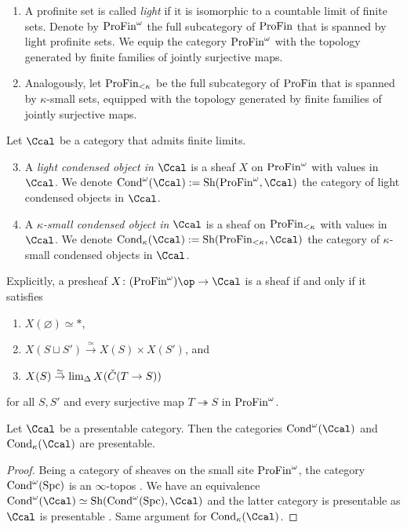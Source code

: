 \documentclass[colorinlistoftodos,article,11pt,reqno]{article}
\newcommand{\Cond}{\textup{Cond}}
\newcommand{\Spc}{\textup{Spc}}
\newcommand{\Sh}{\textup{Sh}}
\newcommand{\ProFin}{\textup{ProFin}}
\renewcommand{\to}[1][]{\overset{#1}{\rightarrow}}
\newcommand{\surj}[1][]{\overset{#1}{\twoheadrightarrow}}		%
\begin{document}
\begin{appendix}
\begin{defi}
\begin{enumerate}
\item A profinite set is called \emph{light} if it is isomorphic to a countable limit of finite sets. Denote by $\ProFin^\omega$ the full subcategory of $\ProFin$ that is spanned by light profinite sets. 
We equip the category $\ProFin^\omega$ with the topology generated by finite families of jointly surjective maps.
\item Analogously, let $\ProFin_{<\kappa}$ be the full subcategory of $\ProFin$ that is spanned by $\kappa$-small sets, equipped with the topology generated by finite families of jointly surjective maps.
\end{enumerate}
Let $\Ccal$ be a category that admits finite limits.
\begin{enumerate} \setcounter{enumi}{2}
\item A \emph{light condensed object in} $\Ccal$ is a sheaf $X$ on $\ProFin^\omega$ with values in $\Ccal$.
We denote $\Cond^\omega(\Ccal) := \Sh(\ProFin^\omega,\Ccal)$ the category of light condensed objects in $\Ccal$.
\item A $\kappa$\emph{-small condensed object in} $\Ccal$ is a sheaf on $\ProFin_{<\kappa}$ with values in $\Ccal$.
We denote $\Cond_\kappa(\Ccal) := \Sh(\ProFin_{<\kappa} ,\Ccal)$ the category of $\kappa$-small condensed objects in $\Ccal$.
\end{enumerate}
\end{defi}

\begin{rem}
Explicitly, a presheaf $X\colon (\ProFin^\omega)\op\to\Ccal$ is a sheaf if and only if it satisfies
\begin{enumerate}
    \item $X(\varnothing)\simeq *$,
    \item $X(S\sqcup S') \to[\simeq] X(S)\times X(S')$, and
    \item $X(S) \to[\simeq] \lim_\Delta X(\Check{C}(T\to S))$ 
\end{enumerate}
for all $S,S'$ and every surjective map $T\surj S$ in $\ProFin^\omega$.
\end{rem}



\begin{lemma} \label{condensed-objects-presentable--lem}
Let $\Ccal$ be a presentable category. Then the categories $\Cond^\omega(\Ccal)$ and $\Cond_\kappa(\Ccal)$ are presentable.
\end{lemma}
\begin{proof}
Being a category of sheaves on the small site $\ProFin^\omega$, the category $\Cond^\omega(\Spc)$ is an $\infty$-topos \cite[6.2.2.7]{HTT}. We have an equivalence $\Cond^\omega(\Ccal) \simeq \Sh(\Cond^\omega(\Spc),\Ccal)$ \cite[1.3.1.7]{SAG} and the latter category is presentable as $\Ccal$ is presentable \cite[1.3.1.6]{SAG}. 
Same argument for $\Cond_\kappa(\Ccal)$.
\end{proof}


\end{appendix}
\end{document}

